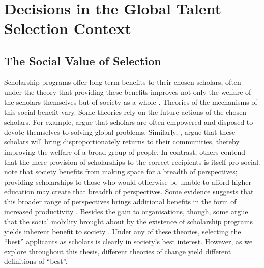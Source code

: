 

\chapter{\label{ch:context}Decisions in the Global Talent Selection Context} 
\minitoc

\section{The Social Value of Selection}\label{sec:social_value}
Scholarship programs offer long-term benefits to their chosen scholars, often under the theory that providing these benefits improves not only the welfare of the scholars themselves but of society as a whole \cite{citation needed}. Theories of the mechanisms of this social benefit vary. Some theories rely on the future actions of the chosen scholars. For example, \textcite{citation needed} argue that scholars are often empowered and disposed to devote themselves to solving global problems. Similarly, \textcite{citation needed}, argue that these scholars will bring disproportionately returns to their communities, thereby improving the welfare of a broad group of people. In contrast, others contend that the mere provision of scholarships to the correct recipients is itself pro-social. \textcite{minkin2023diversity} note that society benefits from making space for a breadth of perspectives; providing scholarships to those who would otherwise be unable to afford higher education may create that breadth of perspectives. Some evidence suggests that this broader range of perspectives brings additional benefits in the form of increased productivity \cite{autor2008does,noray2023systemic}. Besides the gain to organisations, though, some argue that the social mobility brought about by the existence of scholarship programs yields inherent benefit to society \cite{citation needed}. Under any of these theories, selecting the ``best'' applicants as scholars is clearly in society's best interest. However, as we explore throughout this thesis, different theories of change yield different definitions of ``best''.

